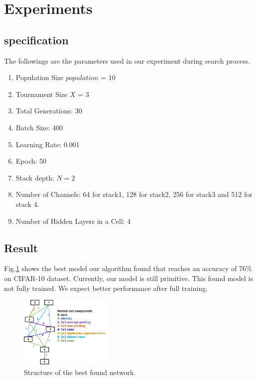 \documentclass[conference]{IEEEtran}
\begin{document}
\section{Experiments}

\subsection{specification}
The followings are the parameters used in our experiment during search process.
\begin{enumerate}
\item Population Size $population$ = 10
\item Tournament Size $X$ = 3
\item Total Generations: 30
\item Batch Size: 400
\item Learning Rate: 0.001
\item Epoch: 50
\item Stack depth: $N = 2$
\item Number of Channels: 64 for stack1, 128 for stack2, 256 for stack3 and 512 for stack 4.
\item Number of Hidden Layers in a Cell: 4
\end{enumerate}

\subsection{Result}

Fig.\ref{found_artc} shows the best model our algorithm found that reaches an accuracy of 76\% on CIFAR-10 dataset. Currently, our model is still primitive. This found model is not fully trained. We expect better performance after full training.

\begin{figure}[H]
     \centering
     \includegraphics[width=0.4\textwidth]{figures/4_hiddenlayer_result.png}
   \caption{Structure of the best found network. }\label{fig:digit}
   \label{found_artc}
  \end{figure}
\end{document}
